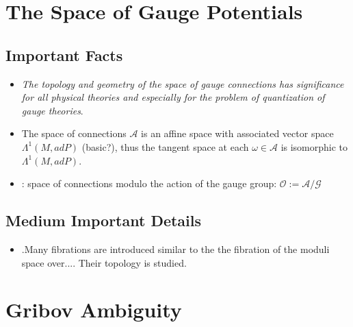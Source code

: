 \documentclass[12pt]{report}
\begin{document}
\section{The Space of Gauge Potentials}

\subsection{Important Facts}
\begin{itemize}
    \item \emph{The topology and geometry of the space of gauge connections has significance for all physical theories and especially for the problem of quantization of gauge theories}.
    
    \item The space of connections $\mathcal A$ is an affine space with associated vector space $\Lambda^1(M, ad P)$ (basic?), thus the tangent space at each $\omega \in \mathcal A$ is isomorphic to $\Lambda^1(M, ad P)$.
    
    \item {}: space of connections modulo the action of the gauge group: $\mathcal O := \mathcal{A/G}$
    
    
\end{itemize}

\subsection{Medium Important Details}
\begin{itemize}
    \item .Many fibrations are introduced similar to the the fibration of the moduli space over.... Their topology is studied.
\end{itemize}

\section{Gribov Ambiguity}
\end{document}
